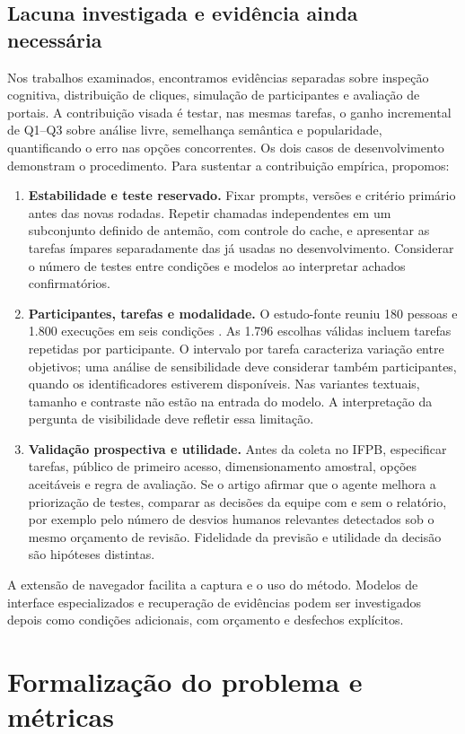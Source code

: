 \documentclass[12pt]{article}
\begin{document}
\subsection{Lacuna investigada e evidência ainda necessária}
Nos trabalhos examinados, encontramos evidências separadas sobre inspeção cognitiva, distribuição de cliques, simulação de participantes e avaliação de portais. A contribuição visada é testar, nas mesmas tarefas, o ganho incremental de Q1--Q3 sobre análise livre, semelhança semântica e popularidade, quantificando o erro nas opções concorrentes. Os dois casos de desenvolvimento demonstram o procedimento. Para sustentar a contribuição empírica, propomos:
\begin{enumerate}[leftmargin=*]
\item \textbf{Estabilidade e teste reservado.} Fixar prompts, versões e critério primário antes das novas rodadas. Repetir chamadas independentes em um subconjunto definido de antemão, com controle do cache, e apresentar as tarefas ímpares separadamente das já usadas no desenvolvimento. Considerar o número de testes entre condições e modelos ao interpretar achados confirmatórios.
\item \textbf{Participantes, tarefas e modalidade.} O estudo-fonte reuniu 180 pessoas e 1.800 execuções em seis condições \cite{kuric2025ia}. As 1.796 escolhas válidas incluem tarefas repetidas por participante. O intervalo por tarefa caracteriza variação entre objetivos; uma análise de sensibilidade deve considerar também participantes, quando os identificadores estiverem disponíveis. Nas variantes textuais, tamanho e contraste não estão na entrada do modelo. A interpretação da pergunta de visibilidade deve refletir essa limitação.
\item \textbf{Validação prospectiva e utilidade.} Antes da coleta no IFPB, especificar tarefas, público de primeiro acesso, dimensionamento amostral, opções aceitáveis e regra de avaliação. Se o artigo afirmar que o agente melhora a priorização de testes, comparar as decisões da equipe com e sem o relatório, por exemplo pelo número de desvios humanos relevantes detectados sob o mesmo orçamento de revisão. Fidelidade da previsão e utilidade da decisão são hipóteses distintas.
\end{enumerate}
A extensão de navegador facilita a captura e o uso do método. Modelos de interface especializados e recuperação de evidências podem ser investigados depois como condições adicionais, com orçamento e desfechos explícitos.

\section{Formalização do problema e métricas}
\label{sec:formal}
\end{document}
